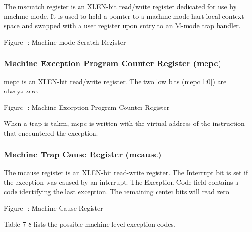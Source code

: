 The mscratch register is an XLEN-bit read/write register dedicated for
use by machine mode. It is used to hold a pointer to a machine-mode
hart-local context space and swapped with a user register upon entry to
an M-mode trap handler.

\missingfigure{}

Figure ‑: Machine-mode Scratch Register

\subsubsection{Machine Exception Program Counter Register
(mepc)}\label{machine-exception-program-counter-register-mepc}

mepc is an XLEN-bit read/write register. The two low bits
(mepc{[}1:0{]}) are always zero.

\missingfigure{}

Figure ‑: Machine Exception Program Counter Register

When a trap is taken, mepc is written with the virtual address of the
instruction that encountered the exception.

\subsubsection{Machine Trap Cause Register
(mcause)}\label{machine-trap-cause-register-mcause}

The mcause register is an XLEN-bit read-write register. The Interrupt
bit is set if the exception was caused by an interrupt. The Exception
Code field contains a code identifying the last exception. The remaining
center bits will read zero

\missingfigure{}

Figure ‑: Machine Cause Register

Table 7‑8 lists the possible machine-level exception codes.

